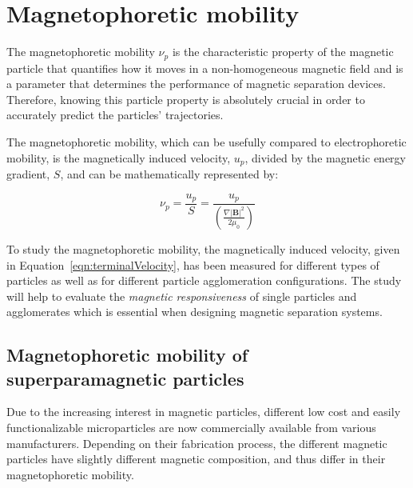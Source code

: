 \section{Magnetophoretic mobility}\label{sec:magnetophoreticMobility}
The magnetophoretic mobility $\nu_{p}$ is the characteristic property of the magnetic particle that quantifies how it moves in a non-homogeneous magnetic field and is a parameter that determines the performance of magnetic separation devices. Therefore, knowing this particle property is absolutely crucial in order to accurately predict the particles' trajectories.

The magnetophoretic mobility, which can be usefully compared to electrophoretic mobility, is the magnetically induced velocity, $u_{p}$, divided by the magnetic energy gradient, $S$, and can be mathematically represented by:

\begin{equation}
	\nu_{p} = \frac{u_{p}}{S} = \frac{u_{p}}{\left(\frac{\nabla |\mathbf{B}|^{2}}{2\mu_{0}}\right)} 
	\label{eqn:magneticMobility}
\end{equation}

To study the magnetophoretic mobility, the magnetically induced velocity, given in Equation~\ref{eqn:terminalVelocity}, has been measured for different types of particles as well as for different particle agglomeration configurations.
The study will help to evaluate the \textit{magnetic responsiveness} of single particles and agglomerates which is essential when designing magnetic separation systems.


\subsection{Magnetophoretic mobility of superparamagnetic particles}\label{subsec:magnetophoreticMobilityOfSuperparamagneticParticles}
Due to the increasing interest in magnetic particles, different low cost and easily functionalizable microparticles are now commercially available from various manufacturers. Depending on their fabrication process, the different magnetic particles have slightly different magnetic composition, and thus differ in their magnetophoretic mobility. 

